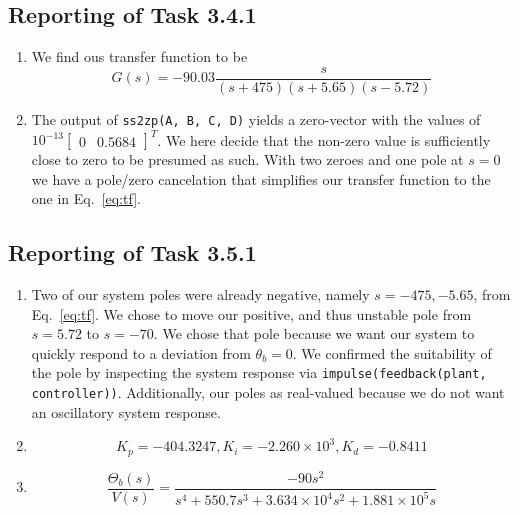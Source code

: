 \documentclass[11pt]{article} %
\begin{document}
\subsection*{Reporting of Task 3.4.1}
\begin{enumerate}
\item %
We find ous transfer function to be
\begin{equation}\label{eq:tf}
  G(s) = -90.03\frac{s}{(s + 475)(s + 5.65)(s - 5.72)}
\end{equation}

\item %
The output of \texttt{ss2zp(A, B, C, D)} yields a zero-vector with the
values of $10^{-13}\begin{bmatrix} 0 & 0.5684 \end{bmatrix}^T$. We here decide that the non-zero
value is sufficiently close to zero to be presumed as such. With two
zeroes and one pole at $s = 0$ we have a pole/zero cancelation that
simplifies our transfer function to the one in Eq.~\eqref{eq:tf}.
\end{enumerate}

\subsection*{Reporting of Task 3.5.1}
\begin{enumerate}
\item %
  Two of our system poles were already negative, namely $s = -475,
  -5.65$, from Eq.~\eqref{eq:tf}. We chose to move our positive, and
  thus unstable pole from $s = 5.72$ to $s = -70$. We chose that pole
  because we want our system to quickly respond to a deviation from
  $\theta_b = 0$. We confirmed the suitability of the pole by
  inspecting the system response via \texttt{impulse(feedback(plant, controller))}.
  Additionally, our poles as real-valued because we do not want an oscillatory system response.
\item %
  $$
  K_p = -404.3247, K_i = -2.260 \times 10^3, K_d = -0.8411
  $$
\item %
  $$
  \frac{\Theta_b(s)}{V(s)} =
  \frac{-90s^2}{
    s^4
    + 550.7s^3
    + 3.634 \times 10^4 s^2
    + 1.881 \times 10^5 s
  }
  $$
\end{enumerate}
\end{document}
